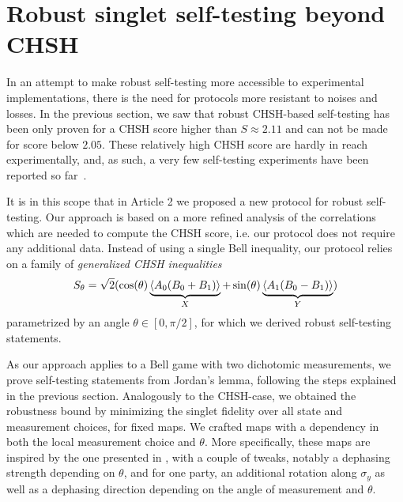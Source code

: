 \section{Robust singlet self-testing beyond CHSH}

In an attempt to make robust self-testing more accessible to experimental implementations, there is the need for protocols more resistant to noises and losses.
In the previous section, we saw that robust CHSH-based self-testing has been only proven for a CHSH score higher than $S\approx 2.11$ and can not be made for score below $2.05$.
These relatively high CHSH score are hardly in reach experimentally, and, as such, a very few self-testing experiments have been reported so far~\cite{Tan2017,Bancal2021}.

It is in this scope that in Article 2 we proposed a new protocol for robust self-testing.
Our approach is based on a more refined analysis of the correlations which are needed to compute the CHSH score, i.e. our protocol does not require any additional data.
Instead of using a single Bell inequality, our protocol relies on a family of \textit{generalized CHSH inequalities}
\begin{equation}
	S_\theta = \sqrt{2}(\cos(\theta) \underbrace{\langle {A_0(B_0+B_1)} \rangle}_{X} + \sin(\theta)\underbrace{\langle {A_1(B_0-B_1)} \rangle}_{Y})
	\label{eq:generalized_CHSH}
\end{equation}
parametrized by an angle $\theta \in [0,\pi/2]$, for which we derived robust self-testing statements.

As our approach applies to a Bell game with two dichotomic measurements, we prove self-testing statements from Jordan's lemma, following the steps explained in the previous section. 
Analogously to the CHSH-case, we obtained the robustness bound by minimizing the singlet fidelity over all state and measurement choices, for fixed maps.
We crafted maps with a dependency in both the local measurement choice and $\theta$.
More specifically, these maps are inspired by the one presented in , with a couple of tweaks, notably a dephasing strength depending on $\theta$, and for one party, an additional rotation along $\sigma_y$ as well as a dephasing direction depending on the angle of measurement and $\theta$.

